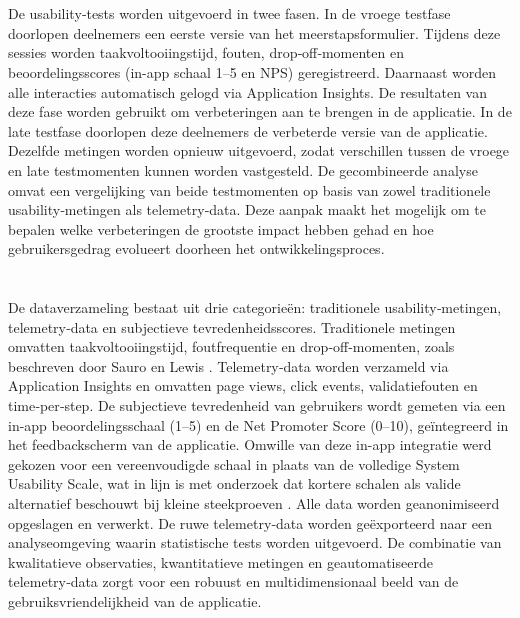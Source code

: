\section{}
De usability‑tests worden uitgevoerd in twee fasen. In de vroege testfase doorlopen deelnemers een eerste versie van het meerstapsformulier. Tijdens deze sessies worden taakvoltooiingstijd, fouten, drop‑off‑momenten en beoordelingsscores (in-app schaal 1–5 en NPS) geregistreerd. Daarnaast worden alle interacties automatisch gelogd via Application Insights. De resultaten van deze fase worden gebruikt om verbeteringen aan te brengen in de applicatie.
In de late testfase doorlopen deze deelnemers de verbeterde versie van de applicatie. Dezelfde metingen worden opnieuw uitgevoerd, zodat verschillen tussen de vroege en late testmomenten kunnen worden vastgesteld. 
De gecombineerde analyse omvat een vergelijking van beide testmomenten op basis van zowel traditionele usability‑metingen als telemetry‑data. Deze aanpak maakt het mogelijk om te bepalen welke verbeteringen de grootste impact hebben gehad en hoe gebruikersgedrag evolueert doorheen het ontwikkelingsproces.


\section{}
De dataverzameling bestaat uit drie categorieën: traditionele usability‑metingen, telemetry‑data en subjectieve tevredenheidsscores. Traditionele metingen omvatten taakvoltooiingstijd, foutfrequentie en drop‑off‑momenten, zoals beschreven door Sauro en Lewis \autocite{SauroLewis2016}. Telemetry‑data worden verzameld via Application Insights en omvatten page views, click events, validatiefouten en time‑per‑step. De subjectieve tevredenheid van gebruikers wordt gemeten via een in-app beoordelingsschaal (1–5) en de Net Promoter Score (0–10), geïntegreerd in het feedbackscherm van de applicatie. Omwille van deze in-app integratie werd gekozen voor een vereenvoudigde schaal in plaats van de volledige System Usability Scale, wat in lijn is met onderzoek dat kortere schalen als valide alternatief beschouwt bij kleine steekproeven \autocite{SauroLewis2016}.
Alle data worden geanonimiseerd opgeslagen en verwerkt. De ruwe telemetry‑data worden geëxporteerd naar een analyseomgeving waarin statistische tests worden uitgevoerd. De combinatie van kwalitatieve observaties, kwantitatieve metingen en geautomatiseerde telemetry‑data zorgt voor een robuust en multidimensionaal beeld van de gebruiksvriendelijkheid van de applicatie.

